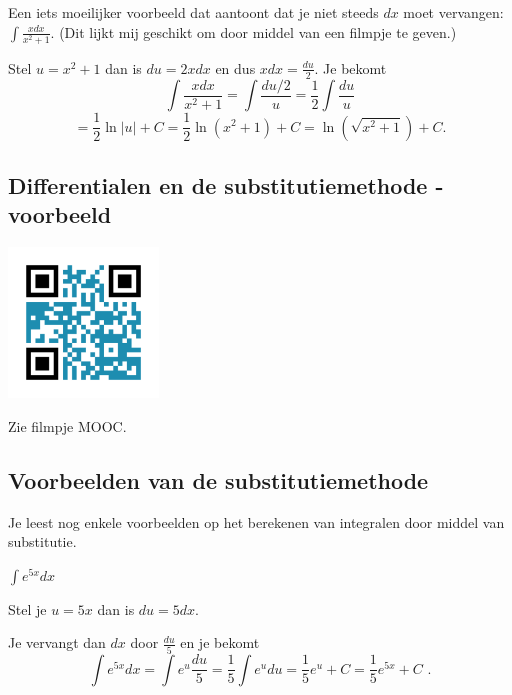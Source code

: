 \begin{voorbeeld}
	Een iets moeilijker voorbeeld dat aantoont dat je niet steeds $dx$ moet vervangen: $\int \frac{xdx}{x^2+1}$.
\noindent (Dit lijkt mij geschikt om door middel van een filmpje te geven.)

Stel $u=x^2+1$ dan is $du=2xdx$ en dus $xdx=\frac{du}{2}$.
Je bekomt
\[
\int \frac{xdx}{x^2+1}=\int \frac{du/2}{u}=\frac{1}{2} \int \frac{du}{u}
\]
\[
=\frac{1}{2} \ln \vert u \vert +C=\frac{1}{2} \ln \left( x^2+1 \right)+C=\ln \left( \sqrt{x^2+1} \right)+C \text {.}
\]


\end{voorbeeld}

\subsection{Differentialen en de substitutiemethode - voorbeeld}
\begin{minipage}{.25\linewidth}
	\raggedright
	\includegraphics[width=4cm]{6_afgeleiden_integralen/inputs/QR_Code_DIFFSUBSTVB_module6_3}
\end{minipage}
\begin{minipage}{.7\linewidth}
	Zie filmpje MOOC.
\end{minipage}

\subsection{Voorbeelden van de substitutiemethode}

Je leest nog enkele voorbeelden op het berekenen van integralen door middel van substitutie.

\vspace{2mm}

\begin{voorbeeld}
	$\int e^{5x}dx$
	
	Stel je $u=5x$ dan is $du=5dx$.
	
	Je vervangt dan $dx$ door $\frac{du}{5}$ en je bekomt
	\[
	\int e^{5x}dx=\int e^u\frac{du}{5}=\frac{1}{5} \int e^udu=\frac{1}{5} e^u+C=\frac{1}{5}e^{5x}+C \text { .}
	\]
	
\end{voorbeeld}

